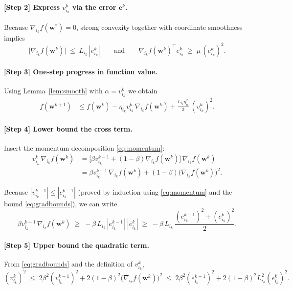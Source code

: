 \documentclass[11pt]{article}
\begin{document}
\paragraph{[Step 2] Express $v_{i_k}^{k}$ via the error $\mathbf e^{k}$.}
Because $\nabla_{i_k} f(\mathbf w^{*})=0$, strong convexity together with
coordinate smoothness implies
\[
\bigl|\nabla_{i_k} f(\mathbf w^{k})\bigr|
\;\le\;
L_{i_k}\,|e^{k}_{i_k}|
\qquad\text{and}\qquad
\nabla_{i_k} f(\mathbf w^{k})^{\!\top} e^{k}_{i_k}
\;\ge\;
\mu\, (e^{k}_{i_k})^{2}.
\tag{3}
\label{eq:gradbounds}
\]

\paragraph{[Step 3] One‑step progress in function value.}
Using Lemma~\ref{lem:smooth} with $\alpha = v_{i_k}^{k}$ we obtain
\[
\begin{aligned}
f(\mathbf w^{k+1})
&\le f(\mathbf w^{k})
   - \eta_{i_k} v_{i_k}^{k}\,\nabla_{i_k} f(\mathbf w^{k})
   + \frac{L_{i_k}\eta_{i_k}^{2}}{2}\,(v_{i_k}^{k})^{2}.
\end{aligned}
\tag{4}
\label{eq:one_step}
\]

\paragraph{[Step 4] Lower bound the cross term.}
Insert the momentum decomposition \eqref{eq:momentum}:
\[
\begin{aligned}
v_{i_k}^{k}\,\nabla_{i_k} f(\mathbf w^{k})
&= \bigl[\beta v_{i_k}^{k-1} + (1-\beta)\nabla_{i_k} f(\mathbf w^{k})\bigr]
   \,\nabla_{i_k} f(\mathbf w^{k})\\[2pt]
&= \beta v_{i_k}^{k-1}\,\nabla_{i_k} f(\mathbf w^{k})
   + (1-\beta)\bigl(\nabla_{i_k} f(\mathbf w^{k})\bigr)^{2}.
\end{aligned}
\tag{5}
\label{eq:cross}
\]

Because $|v_{i_k}^{k-1}|\le |e^{k-1}_{i_k}|$ (proved by induction using
\eqref{eq:momentum} and the bound \eqref{eq:gradbounds}), we can write
\[
\beta v_{i_k}^{k-1}\,\nabla_{i_k} f(\mathbf w^{k})
\;\ge\;
- \beta\,L_{i_k}\,|e^{k-1}_{i_k}|\;|e^{k}_{i_k}|
\;\ge\;
- \beta\,L_{i_k}\,\frac{(e^{k-1}_{i_k})^{2}+(e^{k}_{i_k})^{2}}{2}.
\tag{6}
\label{eq:crossbound}
\]

\paragraph{[Step 5] Upper bound the quadratic term.}
From \eqref{eq:gradbounds} and the definition of $v_{i_k}^{k}$,
\[
(v_{i_k}^{k})^{2}
\;\le\;
2\beta^{2}(v_{i_k}^{k-1})^{2}
   +2(1-\beta)^{2}\bigl(\nabla_{i_k} f(\mathbf w^{k})\bigr)^{2}
\;\le\;
2\beta^{2}(e^{k-1}_{i_k})^{2}
   +2(1-\beta)^{2}L_{i_k}^{2}(e^{k}_{i_k})^{2}.
\tag{7}
\label{eq:quadbound}
\]
\end{document}
